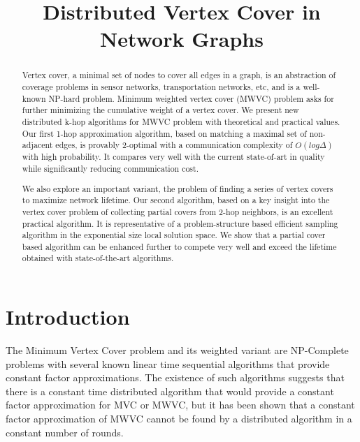 \documentclass[conference, 10pt]{IEEEtran}
\begin{document}
\title{Distributed Vertex Cover in Network Graphs} 

\author{
}

\maketitle

\begin{abstract}
 Vertex cover, a minimal set of nodes to cover all edges in a graph, is an abstraction of coverage problems in sensor networks, transportation networks, etc, and is a well-known NP-hard problem.  Minimum weighted vertex cover (MWVC) problem asks for further minimizing the cumulative weight of a vertex cover.  We present new distributed k-hop algorithms for MWVC problem with theoretical and practical values.  Our first 1-hop approximation algorithm, based on matching a maximal set of non-adjacent edges, is provably 2-optimal with a communication complexity of $O(log \Delta)$ with high probability. It compares very well with the current state-of-art in quality while significantly reducing communication cost.

We also explore an important variant, the problem of finding a series of vertex covers to maximize network lifetime.  Our second algorithm, based on a key insight into the vertex cover problem of collecting partial covers from 2-hop neighbors, is an excellent practical algorithm.  It is representative of a problem-structure based efficient sampling algorithm in the exponential size local solution space.   We show that a partial cover based algorithm can be enhanced further to compete very well and exceed the lifetime obtained with state-of-the-art algorithms. 
\end{abstract}
\section{Introduction}
The Minimum Vertex Cover problem and its weighted variant are NP-Complete problems with several known linear time sequential algorithms that provide constant factor approximations. The existence of such algorithms suggests that there is a constant time distributed algorithm that would provide a constant factor approximation for MVC or MWVC, but it has been shown that a constant factor approximation of MWVC cannot be found by a distributed algorithm in a constant number of rounds\cite{1011811}. 
\end{document}
